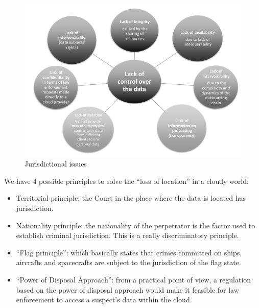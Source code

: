 \begin{figure}[H]
  \centering
  \includegraphics[scale=.6]{img/jurisdiction problem.png}
  \caption{Jurisdictional issues}
  \label{fig:jurisdiction}
\end{figure}
We have 4 possible principles to solve the “loss of location” in a 
cloudy world:
\begin{itemize}
  \item Territorial principle: the Court in the place where the data
    is located has jurisdiction.
  \item Nationality principle: the nationality of the perpetrator is
    the factor used to establish criminal jurisdiction. This is a
    really discriminatory principle.
  \item “Flag principle”: which basically states that crimes committed
    on ships, aircrafts and spacecrafts are subject to the
    jurisdiction of the flag state.
  \item “Power of Disposal Approach”: from a practical point of view,
    a regulation based on the power of disposal approach would make it
    feasible for law enforcement to access a suspect’s data within the
    cloud.
\end{itemize}
